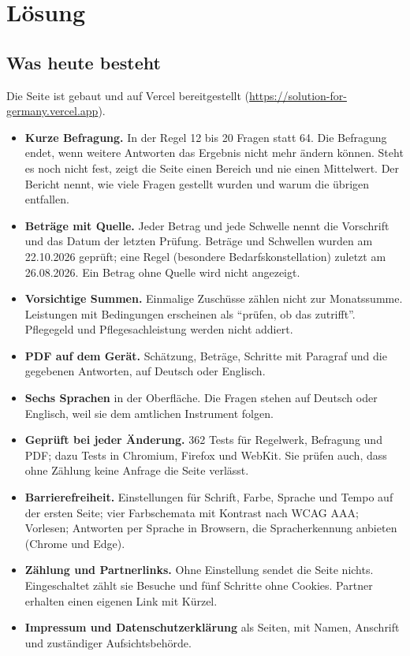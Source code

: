 \documentclass[11pt,a4paper,parskip=half-]{scrartcl}
\begin{document}
\section{Lösung}

\subsection{Was heute besteht}
%
Die Seite ist gebaut und auf Vercel bereitgestellt (\url{https://solution-for-germany.vercel.app}).
\begin{itemize}
  \item \textbf{Kurze Befragung.} In der Regel 12 bis 20 Fragen statt 64.
        Die Befragung endet, wenn weitere Antworten das Ergebnis nicht mehr ändern können.
        Steht es noch nicht fest, zeigt die Seite einen Bereich und nie einen Mittelwert.
        Der Bericht nennt, wie viele Fragen gestellt wurden und warum die übrigen entfallen.
  \item \textbf{Beträge mit Quelle.} Jeder Betrag und jede Schwelle nennt die Vorschrift
        und das Datum der letzten Prüfung. Beträge und Schwellen wurden am 22.10.2026 geprüft;
        eine Regel (besondere Bedarfskonstellation) zuletzt am 26.08.2026. Ein Betrag ohne Quelle wird nicht angezeigt.
  \item \textbf{Vorsichtige Summen.} Einmalige Zuschüsse zählen nicht zur Monatssumme.
        Leistungen mit Bedingungen erscheinen als \enquote{prüfen, ob das zutrifft}.
        Pflegegeld und Pflegesachleistung werden nicht addiert.
  \item \textbf{PDF auf dem Gerät.} Schätzung, Beträge, Schritte mit Paragraf und die gegebenen
        Antworten, auf Deutsch oder Englisch.
  \item \textbf{Sechs Sprachen} in der Oberfläche. Die Fragen stehen auf Deutsch oder Englisch,
        weil sie dem amtlichen Instrument folgen.
  \item \textbf{Geprüft bei jeder Änderung.} 362 Tests für Regelwerk, Befragung und PDF; dazu Tests
        in Chromium, Firefox und WebKit. Sie prüfen auch, dass ohne Zählung keine Anfrage die Seite verlässt.
  \item \textbf{Barrierefreiheit.} Einstellungen für Schrift, Farbe, Sprache und Tempo auf der
        ersten Seite; vier Farbschemata mit Kontrast nach WCAG AAA; Vorlesen; Antworten per Sprache
        in Browsern, die Spracherkennung anbieten (Chrome und Edge).
  \item \textbf{Zählung und Partnerlinks.} Ohne Einstellung sendet die Seite nichts.
        Eingeschaltet zählt sie Besuche und fünf Schritte ohne Cookies.
        Partner erhalten einen eigenen Link mit Kürzel.
  \item \textbf{Impressum und Datenschutzerklärung} als Seiten, mit Namen, Anschrift und
        zuständiger Aufsichtsbehörde.
\end{itemize}
\end{document}
